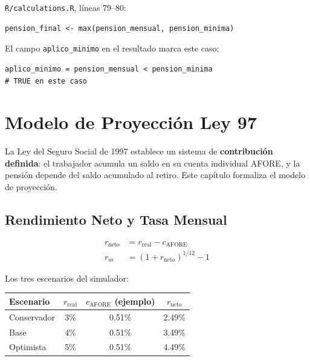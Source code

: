 \documentclass[11pt,a4paper]{report}
\theoremstyle{remark}
\begin{document}
\begin{tcolorbox}[colback=orange!5!white, colframe=orange!75!black, title=\textbf{Aplicaci\'on en C\'odigo}]
\texttt{R/calculations.R}, l\'ineas 79--80:
\begin{lstlisting}
pension_final <- max(pension_mensual, pension_minima)
\end{lstlisting}

El campo \texttt{aplico\_minimo} en el resultado marca este caso:
\begin{lstlisting}
aplico_minimo = pension_mensual < pension_minima
# TRUE en este caso
\end{lstlisting}
\end{tcolorbox}


\chapter{Modelo de Proyecci\'on Ley 97}

La Ley del Seguro Social de 1997 establece un sistema de \textbf{contribuci\'on definida}: el trabajador acumula un saldo en su cuenta individual AFORE, y la pensi\'on depende del saldo acumulado al retiro. Este cap\'itulo formaliza el modelo de proyecci\'on.

\section{Rendimiento Neto y Tasa Mensual}

\begin{tcolorbox}[colback=blue!5!white, colframe=blue!75!black, title=\textbf{Definici\'on Formal}]
\begin{align}
r_{\text{neto}} &= r_{\text{real}} - c_{\text{AFORE}} \label{eq:rneto_def} \\
r_m &= (1 + r_{\text{neto}})^{1/12} - 1 \label{eq:rm_def}
\end{align}

Los tres escenarios del simulador:
\begin{center}
\begin{tabular}{lccc}
\toprule
Escenario & $r_{\text{real}}$ & $c_{\text{AFORE}}$ (ejemplo) & $r_{\text{neto}}$ \\
\midrule
Conservador & 3\% & 0.51\% & 2.49\% \\
Base & 4\% & 0.51\% & 3.49\% \\
Optimista & 5\% & 0.51\% & 4.49\% \\
\bottomrule
\end{tabular}
\end{center}
\end{tcolorbox}
\end{document}
